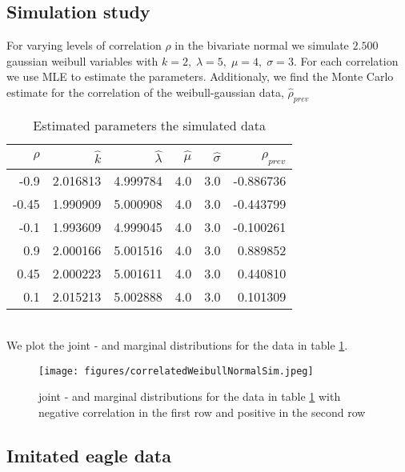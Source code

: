 \subsection{Simulation study}
For varying levels of correlation $\rho$ in the bivariate normal we simulate $2.500$ gaussian weibull variables with $k=2, \; \lambda = 5, \; \mu = 4, \; \sigma = 3$. For each correlation we use MLE to estimate the parameters. Additionaly, we find the Monte Carlo estimate for the correlation of the weibull-gaussian data, $\hat{\rho}_{prev}$
\begin{table}[ht]
    \centering
    \begin{tabular}{rrrrrr}
          \hline
          $\rho$ & $\hat{k}$ & $\hat{\lambda}$ & $\hat{\mu}$ & $\hat{\sigma}$ & $\hat{\rho}_{prev}$\\ 
          \hline
        -0.9 & 2.016813 & 4.999784 & 4.0 & 3.0 & -0.886736 \\ 
          -0.45 & 1.990909 & 5.000908 & 4.0& 3.0 & -0.443799 \\ 
          -0.1 & 1.993609 & 4.999045 & 4.0 & 3.0 & -0.100261 \\ 
          0.9 & 2.000166 & 5.001516 & 4.0 & 3.0 & 0.889852 \\ 
          0.45 & 2.000223 & 5.001611 & 4.0 & 3.0 & 0.440810 \\ 
          0.1 & 2.015213 & 5.002888 & 4.0 & 3.0 & 0.101309 \\ 
           \hline
        \end{tabular}
    \caption{Estimated parameters the simulated data}
    \label{correlationTable}
\end{table}\\
We plot the joint - and marginal distributions for the data in table \ref{correlationTable}.
\begin{figure}[h!]
        \begin{center}
        \texttt{[image: figures/correlatedWeibullNormalSim.jpeg]}
        \caption{joint - and marginal distributions for the data in table \ref{correlationTable} with negative correlation in the first row and positive in the second row}
    \end{center}
    \label{correlationDensities}
\end{figure}

\subsection{Imitated eagle data}
\newpage
